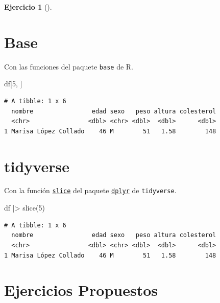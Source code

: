 \documentclass[
  a4paper,
]{scrreport}
\newenvironment{Shaded}{\begin{snugshade}}{\end{snugshade}}
\newcommand{\DecValTok}[1]{\textcolor[rgb]{0.68,0.00,0.00}{#1}}
\newcommand{\FunctionTok}[1]{\textcolor[rgb]{0.28,0.35,0.67}{#1}}
\newcommand{\NormalTok}[1]{\textcolor[rgb]{0.00,0.23,0.31}{#1}}
\newcommand{\SpecialCharTok}[1]{\textcolor[rgb]{0.37,0.37,0.37}{#1}}
\theoremstyle{definition}
\newtheorem{exercise}{Ejercicio}[chapter]
\theoremstyle{remark}
\begin{document}
\begin{exercise}[]
\begin{enumerate}
\begin{tcolorbox}
  \section{Base}

  Con las funciones del paquete \texttt{base} de R.

\begin{Shaded}
\begin{Highlighting}[]
\NormalTok{df[}\DecValTok{5}\NormalTok{, ]}
\end{Highlighting}
\end{Shaded}

\begin{verbatim}
# A tibble: 1 x 6
  nombre                edad sexo   peso altura colesterol
  <chr>                <dbl> <chr> <dbl>  <dbl>      <dbl>
1 Marisa López Collado    46 M        51   1.58        148
\end{verbatim}

  \section{tidyverse}

  Con la función
  \href{https://dplyr.tidyverse.org/reference/slice.html}{\texttt{slice}}
  del paquete
  \href{https://dplyr.tidyverse.org/index.html}{\texttt{dplyr}} de
  \texttt{tidyverse}.

\begin{Shaded}
\begin{Highlighting}[]
\NormalTok{df }\SpecialCharTok{|\textgreater{}} \FunctionTok{slice}\NormalTok{(}\DecValTok{5}\NormalTok{)}
\end{Highlighting}
\end{Shaded}

\begin{verbatim}
# A tibble: 1 x 6
  nombre                edad sexo   peso altura colesterol
  <chr>                <dbl> <chr> <dbl>  <dbl>      <dbl>
1 Marisa López Collado    46 M        51   1.58        148
\end{verbatim}

  \end{tcolorbox}
\end{enumerate}

\end{exercise}

\section{Ejercicios Propuestos}\label{ejercicios-propuestos}
\end{document}
